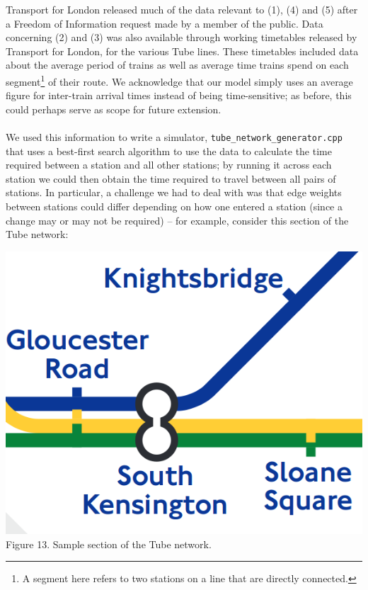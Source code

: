 \documentclass[a4paper, 10pt]{report}
\begin{document}
Transport for London released much of the data relevant to (1), (4) and (5) after a Freedom of Information request made by a member of the public. \cite{foi-chris} Data concerning (2) and (3) was also available through working timetables released by Transport for London, for the various Tube lines. These timetables included data about the average period of trains as well as average time trains spend on each segment\footnote{A segment here refers to two stations on a line that are directly connected.} of their route. \cite{tfl-wtts} We acknowledge that our model simply uses an average figure for inter-train arrival times instead of being time-sensitive; as before, this could perhaps serve as scope for future extension. \\\\
We used this information to write a simulator, \texttt{tube\_network\_generator.cpp} that uses a best-first search algorithm to use the data to calculate the time required between a station and all other stations; by running it across each station we could then obtain the time required to travel between all pairs of stations. In particular, a challenge we had to deal with was that edge weights between stations could differ depending on how one entered a station (since a change may or may not be required) -- for example, consider this section of the Tube network:
\begin{center}
\includegraphics[scale=0.2]{tube_example.png}\\
Figure 13. Sample section of the Tube network.
\end{center}
\end{document}
